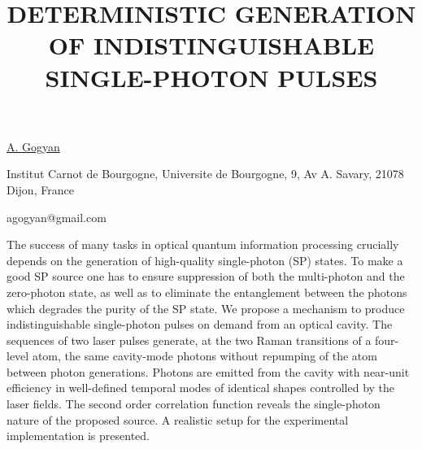 \title{DETERMINISTIC GENERATION OF INDISTINGUISHABLE SINGLE-PHOTON PULSES}

\underline{A. Gogyan} 

{\normalsize{\vspace{-4mm}
Institut Carnot de Bourgogne, Universite de Bourgogne, 9, Av A.
Savary, 21078 Dijon, France

\email agogyan@gmail.com}}

The success of many tasks in optical quantum information processing crucially depends on the generation of high-quality single-photon (SP) states. To make a good SP source one has to ensure suppression of both the multi-photon and the zero-photon state, as well as to eliminate the entanglement between the photons which degrades the purity of the SP state.
We propose a mechanism to produce indistinguishable single-photon pulses on demand from an optical cavity. The sequences of two laser pulses generate, at the two Raman transitions of a four-level atom, the same  cavity-mode photons without repumping of the atom between photon generations. Photons are emitted from the cavity with near-unit efficiency in well-defined temporal modes of identical shapes controlled by the laser fields. The second order correlation function reveals the single-photon nature of the proposed source. A realistic setup for the experimental implementation is presented.

\vspace{\baselineskip} 
